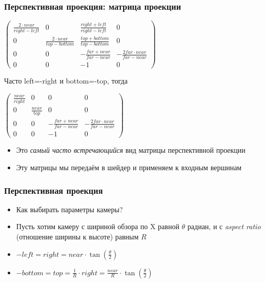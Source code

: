 \documentclass[10pt]{beamer}
\begin{document}
\begin{frame}[fragile]
\frametitle{Перспективная проекция: матрица проекции}
\begin{center}
\begin{math}
\begin{pmatrix}
\frac{2\cdot near}{right - left} & 0 & \frac{right + left}{right - left} & 0 \\
0 & \frac{2\cdot near}{top - bottom} & \frac{top + bottom}{top - bottom} & 0 \\
0 & 0 & -\frac{far + near}{far - near} & -\frac{2 far \cdot near}{far - near} \\
0 & 0 & -1 & 0
\end{pmatrix}
\end{math}
\end{center}

\pause
Часто left=-right и bottom=-top, тогда

\begin{center}
\begin{math}
\begin{pmatrix}
\frac{near}{right} & 0 & 0 & 0 \\
0 & \frac{near}{top} & 0 & 0 \\
0 & 0 & -\frac{far + near}{far - near} & -\frac{2 far \cdot near}{far - near} \\
0 & 0 & -1 & 0
\end{pmatrix}
\end{math}
\end{center}
\begin{itemize}
\item Это \textit{самый часто встречающийся} вид матрицы перспективной проекции
\pause
\item Эту матрицы мы передаём в шейдер и применяем к входным вершинам
\end{itemize}
\end{frame}

\begin{frame}[fragile]
\frametitle{Перспективная проекция}
\begin{itemize}
\item Как выбирать параметры камеры?
\pause
\item Пусть хотим камеру с шириной обзора по X равной \begin{math}\theta\end{math} радиан, и с \textit{aspect ratio} (отношение ширины к высоте) равным \begin{math}R\end{math}
\pause
\item \begin{math}-left=right=near \cdot \tan\left(\frac{\theta}{2}\right)\end{math}
\item \begin{math}-bottom=top=\frac{1}{R} \cdot right = \frac{near}{R} \cdot \tan\left(\frac{\theta}{2}\right)\end{math}
\end{itemize}
\end{frame}
\end{document}
